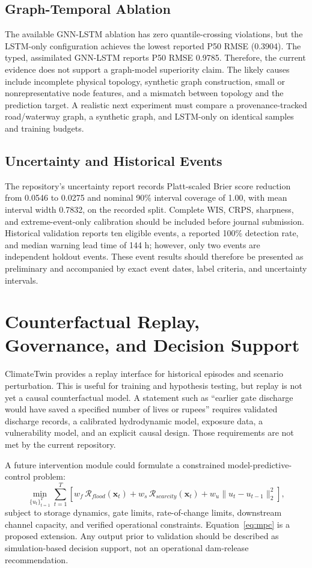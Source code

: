\documentclass[journal]{IEEEtran}
\begin{document}
\subsection{Graph-Temporal Ablation}
The available GNN-LSTM ablation has zero quantile-crossing violations, but the LSTM-only configuration achieves the lowest reported P50 RMSE (0.3904). The typed, assimilated GNN-LSTM reports P50 RMSE 0.9785. Therefore, the current evidence does not support a graph-model superiority claim. The likely causes include incomplete physical topology, synthetic graph construction, small or nonrepresentative node features, and a mismatch between topology and the prediction target. A realistic next experiment must compare a provenance-tracked road/waterway graph, a synthetic graph, and LSTM-only on identical samples and training budgets.

\subsection{Uncertainty and Historical Events}
The repository's uncertainty report records Platt-scaled Brier score reduction from 0.0546 to 0.0275 and nominal 90\% interval coverage of 1.00, with mean interval width 0.7832, on the recorded split. Complete WIS, CRPS, sharpness, and extreme-event-only calibration should be included before journal submission. Historical validation reports ten eligible events, a reported 100\% detection rate, and median warning lead time of 144 h; however, only two events are independent holdout events. These event results should therefore be presented as preliminary and accompanied by exact event dates, label criteria, and uncertainty intervals.

\section{Counterfactual Replay, Governance, and Decision Support}
ClimateTwin provides a replay interface for historical episodes and scenario perturbation. This is useful for training and hypothesis testing, but replay is not yet a causal counterfactual model. A statement such as ``earlier gate discharge would have saved a specified number of lives or rupees'' requires validated discharge records, a calibrated hydrodynamic model, exposure data, a vulnerability model, and an explicit causal design. Those requirements are not met by the current repository.

A future intervention module could formulate a constrained model-predictive-control problem:
\begin{equation}
\min_{\{u_t\}_{t=1}^{T}}\sum_{t=1}^{T}\left[w_f\,\mathcal{R}_{flood}(\mathbf{x}_t)+w_s\,\mathcal{R}_{scarcity}(\mathbf{x}_t)+w_u\|u_t-u_{t-1}\|_2^2\right],
\label{eq:mpc}
\end{equation}
subject to storage dynamics, gate limits, rate-of-change limits, downstream channel capacity, and verified operational constraints. Equation~\eqref{eq:mpc} is a proposed extension. Any output prior to validation should be described as simulation-based decision support, not an operational dam-release recommendation.
\end{document}
